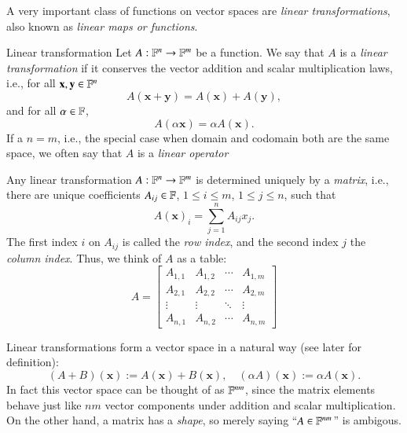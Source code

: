 A very important class of functions on vector spaces are \emph{linear transformations}, also known as  \emph{linear maps or functions}. 
\begin{myDefinition}{Linear transformation}{}
    Let $A : \mathbb{F}^n \to \mathbb{F}^m$ be a function. We say that $A$ is a \emph{linear transformation} if it conserves the vector addition and scalar multiplication laws, i.e., for all $\mathbf{x},\mathbf{y} \in \mathbb{F}^n$
    \begin{equation}
        A(\mathbf{x} + \mathbf{y}) = A(\mathbf{x}) + A(\mathbf{y}),
    \end{equation}
    and for all $\alpha \in \mathbb{F}$,
    \begin{equation}
        A(\alpha\mathbf{x}) = \alpha A(\mathbf{x}).
    \end{equation}
    If a $n=m$, i.e., the special case when domain and codomain both are the same space, we often say that $A$ is a \emph{linear operator}
\end{myDefinition}

Any linear transformation $A : \mathbb{F}^n\to \mathbb{F}^m$ is determined uniquely by a \emph{matrix}, i.e., there are unique coefficients $A_{ij}\in \mathbb{F}$, $1 \leq i \leq m$, $1 \leq j\leq n$, such that
\begin{equation}
    A(\mathbf{x})_i = \sum_{j=1}^n A_{ij} x_j.
\end{equation}
The first index $i$ on $A_{ij}$ is called the \emph{row index}, and the second index $j$ the \emph{column index}. Thus, we think of $A$ as a table:
\begin{equation}
A = \begin{bmatrix}
A_{1,1} & A_{1,2} & \cdots & A_{1,m} \\
A_{2,1} & A_{2,2} & \cdots & A_{2,m} \\
\vdots & \vdots & \ddots & \vdots \\
A_{n,1} & A_{n,2} & \cdots & A_{n,m}
\end{bmatrix}
\end{equation}

Linear transformations form a vector space in a natural way (see later for definition):
\begin{equation}
    (A + B)(\mathbf{x}) := A(\mathbf{x}) + B(\mathbf{x}), \quad (\alpha A)(\mathbf{x}) := \alpha A(\mathbf{x}). \label{eq:operator-linear-space}
\end{equation}
In fact this vector space can be thought of as $\mathbb{F}^{nm}$, since the matrix elements behave just like $nm$ vector components under addition and scalar multiplication. On the other hand, a matrix has a \emph{shape}, so merely saying ``$A \in \mathbb{F}^{nm}$'' is ambigous.

